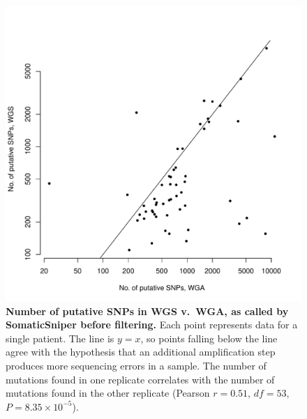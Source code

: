 \documentclass[11pt]{article} %
\begin{document}
{%
\begin{figure}
\centerline{
\includegraphics[width=5in]{C282_v_C484.pdf} }
\caption{\textbf{Number of putative SNPs in WGS v.\ WGA, as called by SomaticSniper before filtering.} Each point represents data for a single patient. The line is $y=x$, so points falling below the line agree with the hypothesis that an additional amplification step produces more sequencing errors in a sample. The number of mutations found in one replicate correlates with the number of mutations found in the other replicate (Pearson $r=0.51$, $df = 53$, $P = 8.35\times 10^{-5}$).}
\label{fig:C282_v_C484}
\end{figure}

}
\end{document}
